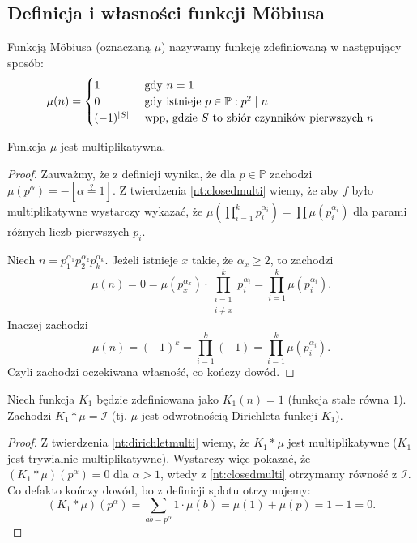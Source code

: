 \subsection{Definicja i własności funkcji Möbiusa}
\begin{definition}
	Funkcją Möbiusa (oznaczaną \(\mu\)) nazywamy funkcję
	zdefiniowaną w następujący sposób:
	\begin{equation*}
		\mu(n) = \begin{cases}
			1               & \text{ gdy } n = 1                                      \\
			0               & \text{ gdy istnieje } p \in \mathbb P: p^2 \mid n       \\
      (-1)^{\card{S}} & \text{ wpp, gdzie $S$ to zbiór czynników pierwszych } n
		\end{cases}
	\end{equation*}
\end{definition}

\begin{fact}
	Funkcja \(\mu\) jest multiplikatywna.
\end{fact}
\begin{proof}
	Zauważmy, że z definicji wynika, że dla \(p \in \mathbb P\) zachodzi
	\(\mu(p^{\alpha}) = -[\alpha \stackrel{?}{=} 1]\).
	Z twierdzenia \ref{nt:closedmulti}
	wiemy, że aby \(f\) było multiplikatywne wystarczy wykazać, że
	\(\mu(\prod_{i=1}^{k} p_i^{\alpha_i}) = \prod \mu(p_i^{\alpha_i})\)
	dla parami różnych liczb pierwszych \(p_i\).

	Niech \(n = p_1^{\alpha_1}p_2^{\alpha_2}p_k^{\alpha_k}\).
	Jeżeli istnieje \(x\) takie, że \(\alpha_x \geq 2\), to
	zachodzi \[\mu(n) = 0 = \mu(p_x^{\alpha_x}) \cdot \prod_{\substack{i = 1 \\ i \neq x}}^k p_i^{\alpha_i} = \prod_{i=1}^{k} \mu(p_i^{\alpha_i}).\]
	Inaczej zachodzi \[\mu(n) = (-1)^{k} = \prod_{i=1}^{k} (-1) = \prod_{i=1}^{k} \mu(p_i^{\alpha_i}).\]
	Czyli zachodzi oczekiwana własność, co kończy dowód.
\end{proof}

\begin{theorem}
	Niech funkcja \(K_1\) będzie zdefiniowana jako \(K_1(n) = 1\)
	(funkcja stałe równa \(1\)). Zachodzi \(K_1 * \mu = \mathcal I\)
	(tj. \(\mu\) jest odwrotnością Dirichleta funkcji \(K_1\)).
\end{theorem}
\begin{proof}
	Z twierdzenia \ref{nt:dirichletmulti}
	wiemy, że \(K_1 * \mu\) jest multiplikatywne (\(K_1\) jest trywialnie multiplikatywne).
	Wystarczy więc pokazać, że \((K_1 * \mu)(p^\alpha) = 0\) dla \(\alpha > 1\), wtedy z \ref{nt:closedmulti}
	otrzymamy równość z \(\mathcal I\). Co defakto kończy dowód, bo z definicji splotu otrzymujemy:
	\[(K_1 * \mu)(p^\alpha) = \sum_{ab = p^\alpha} 1 \cdot \mu(b) = \mu(1) + \mu(p) = 1 - 1 = 0.\]
\end{proof}


